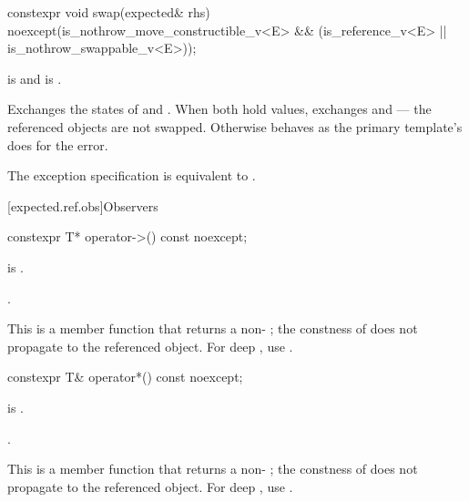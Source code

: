 %
\begin{itemdecl}
constexpr void swap(expected& rhs) noexcept(is_nothrow_move_constructible_v<E> &&
                                            (is_reference_v<E> ||
                                             is_nothrow_swappable_v<E>));
\end{itemdecl}

\begin{itemdescr}
\pnum
\constraints
{} is  and  is .

\pnum
\effects
Exchanges the states of  and . When both hold values, exchanges  and  — the referenced objects are not swapped. Otherwise behaves as the primary template's  does for the error.

\pnum
\remarks
The exception specification is equivalent to .
\end{itemdescr}

[expected.ref.obs]{Observers}

%
\begin{itemdecl}
constexpr T* operator->() const noexcept;
\end{itemdecl}

\begin{itemdescr}
\pnum
\expects
{} is .

\pnum
\returns
{}.

\pnum
\remarks
This is a  member function that returns a non- ; the constness of  does not propagate to the referenced object. For deep , use .
\end{itemdescr}

%
\begin{itemdecl}
constexpr T& operator*() const noexcept;
\end{itemdecl}

\begin{itemdescr}
\pnum
\expects
{} is .

\pnum
\returns
{}.

\pnum
\remarks
This is a  member function that returns a non- ; the constness of  does not propagate to the referenced object. For deep , use .
\end{itemdescr}

